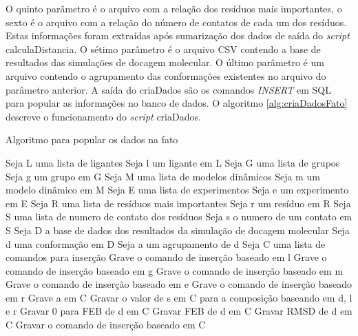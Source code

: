 \begin{itemize}
O quinto parâmetro é o arquivo com a relação dos resíduos mais importantes, o sexto é o arquivo com a relação do número de contatos de cada um dos resíduos. Estas informações foram extraídas após sumarização dos dados de saída do \emph{script} calculaDistancia. O sétimo parâmetro é o arquivo CSV contendo a base de resultados das simulações de docagem molecular. O último parâmetro é um arquivo contendo o agrupamento das conformações existentes no arquivo do parâmetro anterior. A saída do criaDados são os comandos \emph{INSERT} em SQL para popular as informações no banco de dados. O algoritmo \ref{alg:criaDadosFato} descreve o funcionamento do \emph{script} criaDados.

\begin{algorithm}[H]
\caption{Algoritmo para popular os dados na fato}
\label{alg:criaDadosFato}
{\fontsize{10}{10}\selectfont
\begin{algorithmic}[1]
	\STATE Seja L uma lista de ligantes
	\STATE Seja l um ligante em L
	\STATE Seja G uma lista de grupos
	\STATE Seja g um grupo em G
	\STATE Seja M uma lista de modelos dinâmicos
	\STATE Seja m um modelo dinâmico em M
	\STATE Seja E uma lista de experimentos
	\STATE Seja e um experimento em E
	\STATE Seja R uma lista de resíduos mais importantes
	\STATE Seja r um resíduo em R
	\STATE Seja S uma lista de numero de contato dos resíduos
	\STATE Seja s o numero de um contato em S
	\STATE Seja D a base de dados dos resultados da simulação de docagem molecular
	\STATE Seja d uma conformação em D
	\STATE Seja a um agrupamento de d
	\STATE Seja C uma lista de comandos para inserção
		\STATE Grave o comando de inserção baseado em l
	\ENDFOR
		\STATE Grave o comando de inserção baseado em g
        \ENDFOR
		\STATE Grave o comando de inserção baseado em m
        \ENDFOR
		\STATE Grave o comando de inserção baseado em e
        \ENDFOR
		\STATE Grave o comando de inserção baseado em r
	\ENDFOR
		\STATE Grave a em C
				\STATE Gravar o valor de s em C para a composição baseando em d, l e r
			\ENDFOR
				\STATE Gravar 0 para FEB de d em C
			\ELSE
				\STATE Gravar FEB de d em C
			\ENDIF
			\STATE Gravar RMSD de d em C
			\STATE Gravar o comando de inserção baseado em C
		\ENDFOR
	\ENDFOR
\end{algorithmic}
}
\end{algorithm}


\end{itemize}
